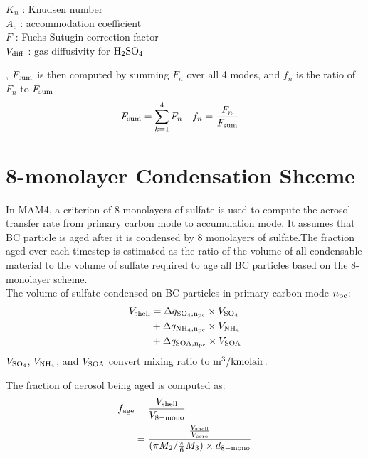 \documentclass{article}
\begin{document}
\begin{flushleft}
$K_n$ : Knudsen number \\
$A_c$ : accommodation coefficient \\
$F$ : Fuchs-Sutugin correction factor \\
$V_{\rm{diff}}$ : gas diffusivity for  $\rm{H_2SO_4}$
\end{flushleft}
, $F_{\rm{sum}}$ is then computed by summing $F_n$ over all 4 modes, and $f_n$ is the ratio of $F_n$ to $F_{\rm{sum}}$.
\begin{align}
F_{\rm{sum}}  &= \sum_{k=1}^4 F_n          &
f_n          &= \frac{F_n}{F_{\rm{sum}}} 
\end{align}

\section{8-monolayer Condensation Shceme}
In MAM4,  a criterion of 8 monolayers of sulfate is used to compute the aerosol transfer rate from primary carbon mode to accumulation mode. It assumes that BC particle is aged after it is condensed by 8 monolayers of sulfate.The fraction aged over each timestep is estimated as the ratio of the volume of all condensable material to the volume of sulfate required to age all BC particles based on the 8-monolayer scheme. \\

The volume of sulfate condensed on BC particles in primary carbon mode $n_{\rm{pc}}$:
\begin{align}
\begin{split}
V_{\rm{shell}} &=  \Delta q_{\rm{SO_4}, n_{\rm{pc}}} \times V_{\rm{SO_4}} \\
               &+ \Delta q_{\rm{NH_4}, n_{\rm{pc}}} \times V_{\rm{NH_4}} \\
	       &+ \Delta q_{\rm{SOA}, n_{\rm{pc}}} \times V_{\rm{SOA}} 
\end{split}
\end{align}
$V_{\rm{SO_4}}$, $V_{\rm{NH_4}}$, and $V_{\rm{SOA}}$ convert mixing ratio to $\rm{m^3/kmol air}$.

The fraction of aerosol being aged is computed as:
\begin{align}
\begin{split}
f_{\rm{age}} &= \frac{V_{\rm{shell}}}{V_{\rm{8-mono}}}  \\
             &= \frac{\frac{V_{\rm{shell}}}{V_{\rm{core}}}}{(\pi M_2/ \frac{\pi}{6}M_3) \times d_{\rm{8-mono}}}
\end{split}
\end{align}
\end{document}
